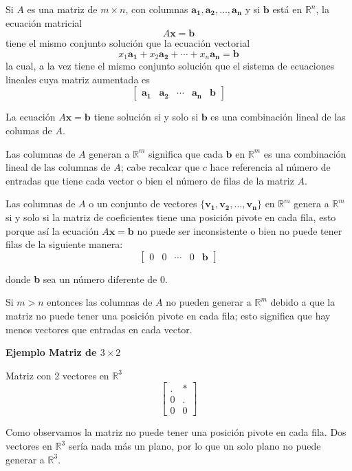 \documentclass{article}
\begin{document}
Si $A$ es una matriz de $m \times n$, con columnas $\mathbf{a_1},\mathbf{a_2},\dots, \mathbf{a_n}$ y si $\mathbf{b}$ está en $\mathbb{R}^n$, la ecuación matricial $$A\mathbf{x} = \mathbf{b}$$ tiene el mismo conjunto solución que la ecuación vectorial $$x_1\mathbf{a_1} + x_2\mathbf{a_2} + \dotsb + x_n\mathbf{a_n} = \mathbf{b}$$ la cual, a la vez tiene el mismo conjunto solución que el sistema de ecuaciones lineales cuya matriz aumentada es $$\begin{bmatrix}\mathbf{a_1}&\mathbf{a_2}& \dotsb & \mathbf{a_n} & \mathbf{b}\end{bmatrix}$$

La ecuación $A\mathbf{x} = \mathbf{b}$ tiene solución si y solo si $\mathbf{b}$ es una combinación lineal de las columas de $A$.

Las columnas de $A$ generan a $\mathbb{R}^m$ significa que cada $\mathbf{b}$ en $\mathbb{R}^m$ es una combinación lineal de las columnas de $A$; cabe recalcar que $c$ hace referencia al número de entradas que tiene cada vector o bien el número de filas de la matriz $A$.

Las columnas de $A$ o un conjunto de vectores $\{\mathbf{v_1}, \mathbf{v_2},..., \mathbf{v_n}\}$ en $\mathbb{R}^m$ genera a $\mathbb{R}^m$ si y solo si la matriz de coeficientes tiene una posición pivote en cada fila, esto porque así la ecuación $A\mathbf{x} = \mathbf{b}$ no puede ser inconsistente o bien no puede tener filas de la siguiente manera: $$\begin{bmatrix}
    0 & 0 & \dotsb & 0 &  \mathbf{b} 
\end{bmatrix}$$

donde \textbf{b} sea un número diferente de 0. 

Si $m>n$ entonces las columnas de $A$ no pueden generar a $\mathbb{R}^m$ debido a que la matriz no puede tener una posición pivote en cada fila; esto significa que hay menos vectores que entradas en cada vector.

\begin{large}
    \textbf{Ejemplo Matriz de $3 \times 2$}
\end{large}

Matriz con 2 vectores en $\mathbb{R}^3$ $$\begin{bmatrix}
    . & *\\
    0 & .\\
    0 & 0
\end{bmatrix}$$

Como observamos la matriz no puede tener una posición pivote en cada fila. Dos vectores en $\mathbb{R}^3$ sería nada más un plano, por lo que un solo plano no puede generar a $\mathbb{R}^3$.
\end{document}
